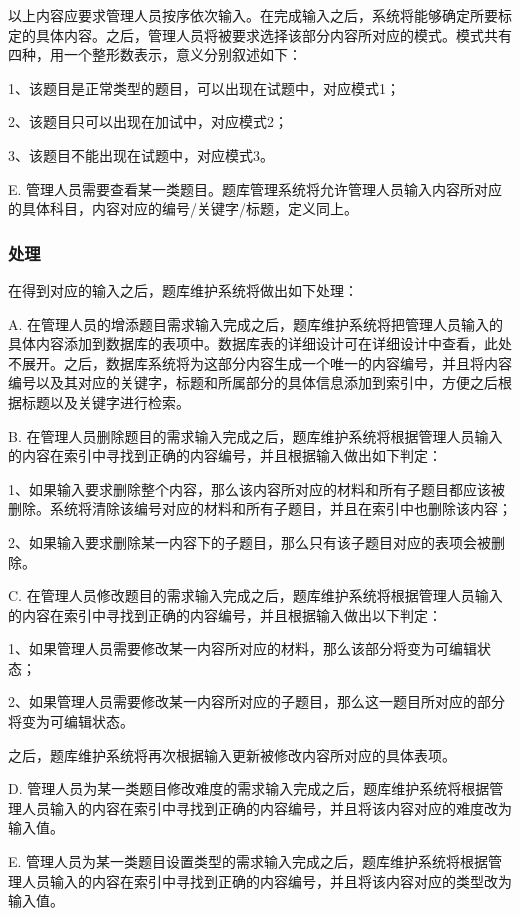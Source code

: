 以上内容应要求管理人员按序依次输入。在完成输入之后，系统将能够确定所要标定的具体内容。之后，管理人员将被要求选择该部分内容所对应的模式。模式共有四种，用一个整形数表示，意义分别叙述如下：

1、该题目是正常类型的题目，可以出现在试题中，对应模式1；

2、该题目只可以出现在加试中，对应模式2；

3、该题目不能出现在试题中，对应模式3。

E. 管理人员需要查看某一类题目。题库管理系统将允许管理人员输入内容所对应的具体科目，内容对应的编号/关键字/标题，定义同上。
	
\subsubsection{处理}
在得到对应的输入之后，题库维护系统将做出如下处理：

A. 在管理人员的增添题目需求输入完成之后，题库维护系统将把管理人员输入的具体内容添加到数据库的表项中。数据库表的详细设计可在详细设计中查看，此处不展开。之后，数据库系统将为这部分内容生成一个唯一的内容编号，并且将内容编号以及其对应的关键字，标题和所属部分的具体信息添加到索引中，方便之后根据标题以及关键字进行检索。

B. 在管理人员删除题目的需求输入完成之后，题库维护系统将根据管理人员输入的内容在索引中寻找到正确的内容编号，并且根据输入做出如下判定：

1、如果输入要求删除整个内容，那么该内容所对应的材料和所有子题目都应该被删除。系统将清除该编号对应的材料和所有子题目，并且在索引中也删除该内容；

2、如果输入要求删除某一内容下的子题目，那么只有该子题目对应的表项会被删除。

C. 在管理人员修改题目的需求输入完成之后，题库维护系统将根据管理人员输入的内容在索引中寻找到正确的内容编号，并且根据输入做出以下判定：

1、如果管理人员需要修改某一内容所对应的材料，那么该部分将变为可编辑状态；

2、如果管理人员需要修改某一内容所对应的子题目，那么这一题目所对应的部分将变为可编辑状态。

之后，题库维护系统将再次根据输入更新被修改内容所对应的具体表项。

D. 管理人员为某一类题目修改难度的需求输入完成之后，题库维护系统将根据管理人员输入的内容在索引中寻找到正确的内容编号，并且将该内容对应的难度改为输入值。

E. 管理人员为某一类题目设置类型的需求输入完成之后，题库维护系统将根据管理人员输入的内容在索引中寻找到正确的内容编号，并且将该内容对应的类型改为输入值。

